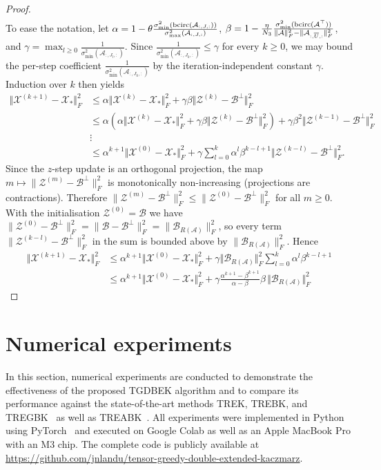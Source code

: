 \documentclass[11pt]{article}
\def\fm#1{\mathcal{#1}}
\def \a#1{\fm A_{:, #1, :}}
\def \x#1{\fm X^{(#1)}}
\begin{document}
\begin{proof}
\begin{align*}
\end{align*}
To ease the notation, let $\alpha =  1 - \theta \frac{\sigma_{\min}^2(\bcirc(\a{J}))}{\sigma^2_{\max}(\a{J})}$, $\beta = 1 - \frac{\eta}{N_3}  \frac{\sigma_{\min}^2(\bcirc(\fm A^\top))}{\Vert \fm A \Vert_F^2 - \Vert \a{\overline{U}} \Vert_F^2}  $, and $\gamma = \max_{l \geq 0}\frac{1}{\sigma_{\min}^2(\a{J_l})}$.
Since $\frac{1}{\sigma_{\min}^2(\a{J_k})}\leq\gamma$ for every $k\geq 0$, we may bound the per-step coefficient $\frac{1}{\sigma_{\min}^2(\a{J_k})}$ by the iteration-independent constant $\gamma$. Induction over $k$ then yields
\begin{align*}
    \Vert \x{k+1} - \fm X_\ast \Vert_F^2  & \leq \alpha  \Vert \x k - \fm X_\ast \Vert_F^2 + \gamma\beta \Vert \fm Z^{(k)} - \fm B^\perp \Vert_F^2\\
    & \leq \alpha \left( \alpha  \Vert \x k - \fm X_\ast \Vert_F^2 + \gamma\beta \Vert \fm Z^{(k)} - \fm B^\perp \Vert_F^2 \right) + \gamma\beta^2 \Vert \fm Z^{(k-1)} - \fm B^\perp \Vert_F^2\\
    &\vdots\\
    & \leq \alpha^{k+1} \Vert \x 0 - \fm X_\ast \Vert_F^2  + \gamma\sum_{l=0}^k \alpha^{l} \beta^{k-l+1}  \Vert \fm Z^{(k-l)} - \fm B^\perp \Vert_F^2.
\end{align*}
Since the $z$-step update is an orthogonal projection, the map
$m\mapsto\|\fm Z^{(m)}-\fm B^\perp\|_F^2$ is monotonically non-increasing
(projections are contractions).
Therefore $\|\fm Z^{(m)}-\fm B^\perp\|_F^2\leq\|\fm Z^{(0)}-\fm B^\perp\|_F^2$
for all $m\geq 0$.
With the initialisation $\fm Z^{(0)}=\fm B$ we have
$\|\fm Z^{(0)}-\fm B^\perp\|_F^2=\|\fm B-\fm B^\perp\|_F^2=\|\fm B_{R(\fm A)}\|_F^2$,
so every term $\|\fm Z^{(k-l)}-\fm B^\perp\|_F^2$ in the sum is bounded above by
$\|\fm B_{R(\fm A)}\|_F^2$.
Hence
\begin{align*}
    \Vert \x{k+1} - \fm X_\ast \Vert_F^2
    &\leq \alpha^{k+1} \Vert \x 0 - \fm X_\ast \Vert_F^2  + \gamma\Vert \fm B_{R(\fm A)}\Vert_F^2 \sum_{l=0}^k \alpha^{l} \beta^{k-l+1}\\
    &\leq \alpha^{k+1} \Vert \x 0 - \fm X_\ast \Vert_F^2 + \gamma\frac{\alpha^{k+1} -\beta^{k+1}}{\alpha - \beta} \beta\,\Vert \fm B_{R(\fm A)}\Vert_F^2
\end{align*}
\end{proof}


\section{Numerical experiments} \label{sec:numexp}
In this section, numerical experiments are conducted to demonstrate the effectiveness of the proposed TGDBEK algorithm and to compare its performance against the state-of-the-art methods TREK, TREBK, and TREGBK~\cite{huang2023TREK} as well as TREABK~\cite{su2025}. All experiments were implemented in Python using PyTorch~\cite{ansel2025pytorch} and executed on Google Colab as well as an Apple MacBook Pro with an M3 chip. The complete code is publicly available at \url{https://github.com/jnlandu/tensor-greedy-double-extended-kaczmarz}.
\end{document}
